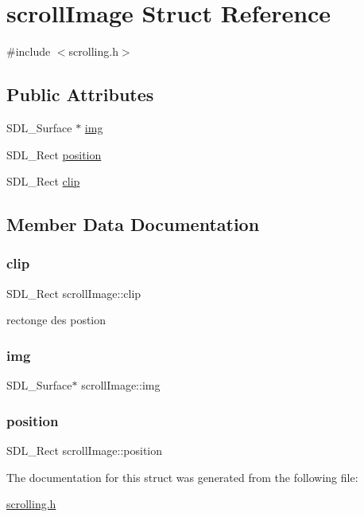 \hypertarget{structscrollImage}{}\section{scroll\+Image Struct Reference}
\label{structscrollImage}


{\ttfamily \#include $<$scrolling.\+h$>$}

\subsection*{Public Attributes}
\begin{DoxyCompactItemize}
\item 
S\+D\+L\+\_\+\+Surface $\ast$ \hyperlink{structscrollImage_a383bb2778507b05b9cdd07cebb441ab6}{img}
\item 
S\+D\+L\+\_\+\+Rect \hyperlink{structscrollImage_a37d0d769130b4c91f59677c412b2f3ce}{position}
\item 
S\+D\+L\+\_\+\+Rect \hyperlink{structscrollImage_a254bdc1d758b12ae66c7f83a02d2c769}{clip}
\end{DoxyCompactItemize}


\subsection{Member Data Documentation}
\mbox{\label{structscrollImage_a254bdc1d758b12ae66c7f83a02d2c769}} 
\subsubsection{\texorpdfstring{clip}{clip}}
{\footnotesize\ttfamily S\+D\+L\+\_\+\+Rect scroll\+Image\+::clip}

rectonge des postion \mbox{\label{structscrollImage_a383bb2778507b05b9cdd07cebb441ab6}} 
\subsubsection{\texorpdfstring{img}{img}}
{\footnotesize\ttfamily S\+D\+L\+\_\+\+Surface$\ast$ scroll\+Image\+::img}

\mbox{\label{structscrollImage_a37d0d769130b4c91f59677c412b2f3ce}} 
\subsubsection{\texorpdfstring{position}{position}}
{\footnotesize\ttfamily S\+D\+L\+\_\+\+Rect scroll\+Image\+::position}



The documentation for this struct was generated from the following file\+:\begin{DoxyCompactItemize}
\item 
\hyperlink{scrolling_8h}{scrolling.\+h}\end{DoxyCompactItemize}
